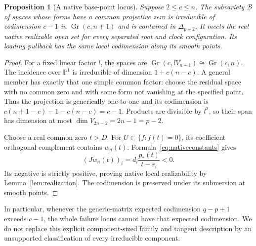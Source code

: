\documentclass[11pt,reqno]{amsart}
\numberwithin{equation}{section}
\newtheorem{proposition}[theorem]{Proposition}
\theoremstyle{definition}\newtheorem{definition}[theorem]{Definition}
\theoremstyle{remark}\newtheorem{remark}[theorem]{Remark}
\newcommand{\Pj}{\mathbb P}
\newcommand{\Gr}{\operatorname{Gr}}
\begin{document}
\begin{proposition}[A native base-point locus]\label{prop:basepoint}
Suppose $2\le c\le n$. The subvariety $\mathcal B$ of spaces whose forms have a common projective zero is irreducible of codimension $c-1$ in $\Gr(c,n+1)$ and is contained in $\Delta_{p-2}$. It meets the real native realizable open set for every separated root and clock configuration. Its loading pullback has the same local codimension along its smooth points.
\end{proposition}
\begin{proof}
For a fixed linear factor $l$, the spaces are $\Gr(c,lV_{n-1})\cong\Gr(c,n)$. The incidence over $\Pj^1$ is irreducible of dimension $1+c(n-c)$. A general member has exactly that one simple common factor: choose the residual space with no common zero and with some form not vanishing at the specified point. Thus the projection is generically one-to-one and its codimension is $c(n+1-c)-1-c(n-c)=c-1$. Products are divisible by $l^2$, so their span has dimension at most $\dim V_{2n-2}=2n-1=p-2$.

Choose a real common zero $t>D$. For $U\subset\{f:f(t)=0\}$, its coefficient orthogonal complement contains $w_n(t)$. Formula~\eqref{eq:nativeconstants} gives
\[
 (Jw_n(t))_i=d_i\frac{p_*(t)}{t-r_i}<0.
\]
Its negative is strictly positive, proving native local realizability by Lemma~\ref{lem:realization}. The codimension is preserved under its submersion at smooth points.
\end{proof}
In particular, whenever the generic-matrix expected codimension $q-p+1$ exceeds $c-1$, the whole failure locus cannot have that expected codimension. We do not replace this explicit component-sized family and tangent description by an unsupported classification of every irreducible component.
\end{document}
